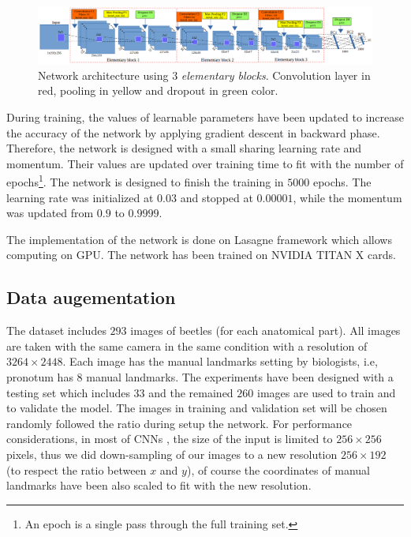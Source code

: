 \documentclass[10pt]{article}
\begin{document}
\begin{figure}[!t]
\centering
\includegraphics[scale=0.32]{images/arch_model}
\caption{{\small{Network architecture using $3$ \textit{elementary blocks}.
  Convolution
  layer in red, pooling in yellow and dropout in green color.}}} 
\label{cnnnetwork2}
\end{figure}

During training, the values of learnable parameters have been updated
to increase the accuracy of the network by applying gradient descent
in backward phase. Therefore, the network is designed with a small
sharing learning rate and momentum. Their values are updated over
training time to fit with the number of epochs\footnote{An epoch is a
  single pass through the full training set.}. The network is designed
to finish the training in $5000$ epochs. The learning rate was
initialized at $0.03$ and stopped at $0.00001$, while the momentum was
updated from $0.9$ to $0.9999$.


The implementation of the network is done
on Lasagne framework \cite{lasagne} which allows computing on GPU. The
network has been trained on NVIDIA TITAN X cards.


\subsection{Data augementation}
\label{sec_data}
The dataset includes $293$ images of beetles (for each anatomical part). All
images are taken with the same camera in the same condition with a
resolution of $3264 \times 2448$. Each image has the manual
landmarks setting by biologists, i.e, pronotum has $8$ manual landmarks. The
experiments have been designed with a testing set which includes $33$
and the remained $260$ images are used to train and to validate the model.
The images in training and validation set will be chosen randomly followed
the ratio during setup the network. For performance considerations, in most of CNNs
\cite{lecun2010convolutional, sun2013deep,  krizhevsky2012imagenet,
  cintas2016automatic}, the size of the input is limited to $256
\times 256$ pixels, thus we did down-sampling of our images to a new
resolution $256 \times 192$ (to respect the ratio between $x$ and
$y$), of course the coordinates of manual landmarks have been also
scaled to fit with the new resolution.
\end{document}
